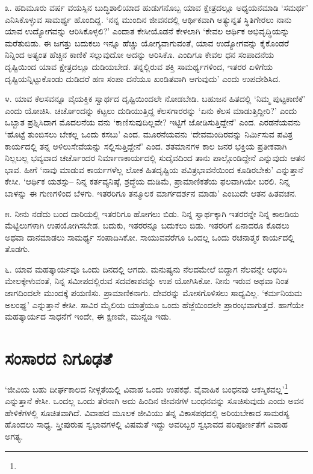 ೩. ಹದಿಮೂರು ವರ್ಷ ವಯಸ್ಸಿನ ಬುದ್ಧಿಶಾಲಿಯಾದ ಹುಡುಗನೊಬ್ಬ ಯಾವ ಕ್ಷೇತ್ರದಲ್ಲೂ ಅಧ್ಯಯನಮಾಡಿ ‘ಸಮರ್ಥ’ ಎನಿಸಿಕೊಳ್ಳುವ ಸಾಮರ್ಥ್ಯ ಹೊಂದಿದ್ದ. ‘ನನ್ನ ಮುಂದಿನ ಜೀವನದಲ್ಲಿ ಆರ್ಥಿಕವಾಗಿ ಅತ್ಯುನ್ನತ ಸ್ಥಿತಿಗೇರಲು ನಾನು ಯಾವ ಉದ್ಯೋಗವನ್ನು ಆರಿಸಿಕೊಳ್ಳಲಿ?’ ಎಂದಾತ ಕೇಸೀಯೊಡನೆ ಕೇಳಲಾಗಿ ‘ಕೇವಲ ಆರ್ಥಿಕ ಅಭಿವೃದ್ಧಿಯನ್ನು ಮರೆತುಬಿಡು. ಈ ಜಗತ್ತು ಬದುಕಲು ಇನ್ನೂ ಹೆಚ್ಚು ಯೋಗ್ಯವಾಗುವಂತೆ, ಯಾವ ಉದ್ಯೋಗವನ್ನು ಕೈಕೊಂಡರೆ ನಿನ್ನಿಂದ ಅತ್ಯಂತ ಹೆಚ್ಚಿನ ಕಾಣಿಕೆ ಸಲ್ಲುವುದೋ ಅದನ್ನು ಆರಿಸಿಕೊ. ಎಂದಿಗೂ ಕೇವಲ ಧನ ಸಂಪಾದನೆಯ ದೃಷ್ಟಿಯಿಂದ ಯಾವ ಕ್ಷೇತ್ರದಲ್ಲೂ ದುಡಿಯಬೇಡ. ತನ್ನಲ್ಲಿರುವ ಶಕ್ತಿ ಸಾಮರ್ಥ್ಯಗಳಿಂದ, ಇತರರ ಏಳಿಗೆಯ ದೃಷ್ಟಿಯನ್ನಿಟ್ಟುಕೊಂಡು ದುಡಿದರೆ ಹಣ ಸಂಪಾ ದನೆಯೂ ಖಂಡಿತವಾಗಿ ಆಗುವುದು’ ಎಂದು ಉಪದೇಶಿಸಿದ.

೪. ಯಾವ ಕೆಲಸವನ್ನೂ ವೈಯಕ್ತಿಕ ಸ್ವಾರ್ಥದ ದೃಷ್ಟಿಯಿಂದಲೇ ನೋಡಬೇಡಿ. ಬಹುಜನ ಹಿತದಲ್ಲಿ ‘ನಿಮ್ಮ ಪುಟ್ಟಕಾಣಿಕೆ’ ಎಂದು ಯೋಚಿಸಿ. ಚರ್ಚೊಂದನ್ನು ಕಟ್ಟಲು ದುಡಿಯುತ್ತಿದ್ದ ಕೆಲಸಗಾರರನ್ನು ‘ಏನು ಕೆಲಸ ಮಾಡುತ್ತಿದ್ದೀರಿ?’ ಎಂದು ಒಬ್ಬಾತ ಪ್ರಶ್ನಿಸಿದಾಗ ಮೊದಲನೆಯ ವನು ‘ಕಾಣಿಸುವುದಿಲ್ಲವೇ? ಇಟ್ಟಿಗೆ ಜೋಡಿಸುತ್ತಿದ್ದೇನೆ’ ಎಂದ. ಎರಡನೆಯವನು ‘ಹೊಟ್ಟೆ ತುಂಬಿಸಲು ಬೇಕಲ್ಲ ಒಂದು ಕಸಬು’ ಎಂದ. ಮೂರನೆಯವನು ‘ದೇವಮಂದಿರವನ್ನು ನಿರ್ಮಿಸುವ ಪವಿತ್ರ ಕಾರ್ಯದಲ್ಲಿ ತನ್ನ ಅಳಿಲುಸೇವೆಯನ್ನು ಸಲ್ಲಿಸುತ್ತಿದ್ದೇನೆ’ ಎಂದ. ಶತಮಾನಗಳ ಕಾಲ ಜನರ ಭಕ್ತಿಯ ಪ್ರತೀಕವಾಗಿ ನಿಲ್ಲಬಲ್ಲ ಭವ್ಯವಾದ ಚರ್ಚೊಂದರ ನಿರ್ಮಾಣಕಾರ್ಯದಲ್ಲಿ ಸುದೈವದಿಂದ ತಾನು ಪಾಲ್ಗೊಂಡಿದ್ದೇನೆ ಎನ್ನುವುದು ಆತನ ಭಾವ. ಹೀಗೆ ‘ನಾವು ಮಾಡುವ ಕಾರ್ಯಗಳೆಲ್ಲ ಲೋಕ ಹಿತದೃಷ್ಟಿಯ ಪವಿತ್ರಭಾವನೆಯಿಂದ ಕೂಡಿರಬೇಕು’ ಎನ್ನುತ್ತಾನೆ ಕೇಸೀ. ‘ಆರ್ಥಿಕ ಯಶಸ್ಸು– ನಿನ್ನ ಕರ್ತವ್ಯನಿಷ್ಠೆ, ಶ್ರದ್ಧೆಯ ದುಡಿಮೆ, ಪ್ರಾಮಾಣಿಕತೆಯ ಫಲವಾಗಿಯೇ ಬರಲಿ. ನಿನ್ನ ಬಾಳನ್ನು ಈ ಗುಣಗಳಿಂದ ಬೆಳಗು. ಇತರರಿಗೂ ತನ್ಮೂಲಕ ಮಾರ್ಗದರ್ಶನ ಮಾಡು’ ಎಂಬುದೇ ಆತನ ಹಿತವಚನ.

೫. ನೀನು ನಡೆದು ಬಂದ ದಾರಿಯಲ್ಲಿ ಇತರರಿಗೂ ಹೋಗಲು ಬಿಡು. ನಿನ್ನ ಸ್ವಾರ್ಥಕ್ಕಾಗಿ ಇತರರನ್ನೇ ನಿನ್ನ ಕಾಲಡಿಯ ಮೆಟ್ಟಿಲುಗಳಾಗಿ ಉಪಯೋಗಿಸಬೇಡ. ಬದುಕು, ಇತರರನ್ನೂ ಬದುಕಲು ಬಿಡು. ಇತರರಿಗೆ ಏನಾದರೂ ಕೊಡಲು ಅಥವಾ ದಾನಮಾಡಲು ಸಾಮರ್ಥ್ಯ ಸಂಪಾದಿಸಿಕೋ. ಸಾಯುವವರೆಗೂ ಒಂದಲ್ಲ ಒಂದು ರಚನಾತ್ಮಕ ಕಾರ್ಯದಲ್ಲಿ ತೊಡಗು.

೬. ಯಾವ ಮಹತ್ಕಾರ್ಯವೂ ಒಂದು ದಿನದಲ್ಲಿ ಆಗದು. ಮನುಷ್ಯನು ನೆಲದಮೇಲೆ ಬಿದ್ದಾಗ ನೆಲವನ್ನೇ ಆಧರಿಸಿ ಮೇಲಕ್ಕೇಳುವಂತೆ, ನಿನ್ನ ಸಮೀಪದಲ್ಲಿರುವ ಸದವಕಾಶವನ್ನು ಉಪ ಯೋಗಿಸಿಕೋ. ನೀನು ಇರುವ ಅಥವಾ ನಿಂತ ಜಾಗದಿಂದಲೇ ಮುಂದಕ್ಕೆ ಪಯಣಿಸು. ಪ್ರಾಮಾಣಿಕನಾಗು. ದೇವರನ್ನು ಮೋಸಗೊಳಿಸಲು ಸಾಧ್ಯವಿಲ್ಲ. ‘ಕರ್ಮನಿಯಮ ಅಲಂಘ್ಯ’ ಎನ್ನುತ್ತಾನೆ ಕೇಸೀ. ಸಾವಿರ ಮೈಲಿಯ ಯಾತ್ರೆಯೂ ಒಂದು ಹೆಜ್ಜೆಯಿಂದಲೇ ಪ್ರಾರಂಭವಾಗುತ್ತದೆ. ಹಾಗೆಯೇ ಮಹತ್ಕಾರ್ಯದ ಸಾಧನೆಗೆ ಇಂದೇ, ಈ ಕ್ಷಣವೇ, ಮುನ್ನಡಿ ಇಡು.


\section{ಸಂಸಾರದ ನಿಗೂಢತೆ}

‘ಜೀವಿಯ ಬಹು ದೀರ್ಘಕಾಲದ ನೀಳ್ಗತೆಯಲ್ಲಿ ವಿವಾಹ ಒಂದು ಉಪಕಥೆ. ವೈವಾಹಿಕ ಬಂಧನವು ಆಕಸ್ಮಿಕವಲ್ಲ’\footnote{} ಎನ್ನುತ್ತಾನೆ ಕೇಸೀ. ಒಂದಲ್ಲ ಒಂದು ತೆರನಾಗಿ ಅದು ಹಿಂದಿನ ಜೀವನಗಳ ಬಂಧನವನ್ನು ಸೂಚಿಸುವುದು ಎಂದು ಅವನ ಹೇಳಿಕೆಗಳಲ್ಲಿ ಸೂಚಿತವಾಗಿದೆ. ವಿವಾಹದ ಮೂಲಕ ಜೀವಿಯು ತನ್ನ ವಿಕಾಸಪಥದಲ್ಲಿ ಅರಿಯಬೇಕಾದ ಸಾಮರಸ್ಯ ಹೊಂದಲು ಸಾಧ್ಯ. ಸ್ತ್ರೀಪುರುಷ ಸ್ವಭಾವಗಳಲ್ಲಿ ವಿಷಮತೆ ಇದ್ದು ಅವರಿಬ್ಬರ ಸ್ವಭಾವದ ಪರಿಪೂರ್ಣತೆಗೆ ವಿವಾಹ ಅಗತ್ಯ.

